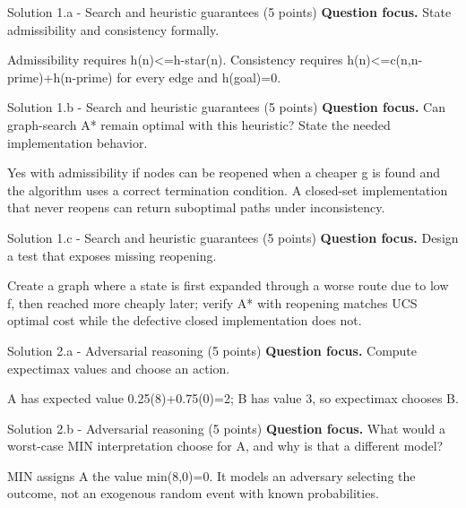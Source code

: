 \documentclass[aspectratio=169,11pt]{beamer}
\begin{document}
\begin{frame}{Solution 1.a - Search and heuristic guarantees (5 points)}
\small
\textbf{Question focus.} State admissibility and consistency formally.

\vspace{0.25cm}
\answerlabel Admissibility requires h(n)<=h-star(n). Consistency requires h(n)<=c(n,n-prime)+h(n-prime) for every edge and h(goal)=0.
\end{frame}

\begin{frame}{Solution 1.b - Search and heuristic guarantees (5 points)}
\small
\textbf{Question focus.} Can graph-search A* remain optimal with this heuristic? State the needed implementation behavior.

\vspace{0.25cm}
\answerlabel Yes with admissibility if nodes can be reopened when a cheaper g is found and the algorithm uses a correct termination condition. A closed-set implementation that never reopens can return suboptimal paths under inconsistency.
\end{frame}

\begin{frame}{Solution 1.c - Search and heuristic guarantees (5 points)}
\small
\textbf{Question focus.} Design a test that exposes missing reopening.

\vspace{0.25cm}
\answerlabel Create a graph where a state is first expanded through a worse route due to low f, then reached more cheaply later; verify A* with reopening matches UCS optimal cost while the defective closed implementation does not.
\end{frame}

\begin{frame}{Solution 2.a - Adversarial reasoning (5 points)}
\small
\textbf{Question focus.} Compute expectimax values and choose an action.

\vspace{0.25cm}
\answerlabel A has expected value 0.25(8)+0.75(0)=2; B has value 3, so expectimax chooses B.
\end{frame}

\begin{frame}{Solution 2.b - Adversarial reasoning (5 points)}
\small
\textbf{Question focus.} What would a worst-case MIN interpretation choose for A, and why is that a different model?

\vspace{0.25cm}
\answerlabel MIN assigns A the value min(8,0)=0. It models an adversary selecting the outcome, not an exogenous random event with known probabilities.
\end{frame}
\end{document}
